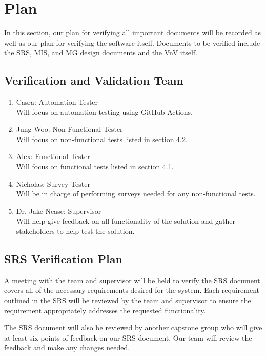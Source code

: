 \documentclass[12pt, titlepage]{article}
\begin{document}
\section{Plan}

In this section, our plan for verifying all important documents will be
recorded as well as our plan for verifying the software itself. Documents to
be verified include the SRS, MIS, and MG design documents and the VnV itself.

\subsection{Verification and Validation Team}

\begin{enumerate}
  \item Casra: Automation Tester\\
  Will focus on automation testing using GitHub Actions.
  \item Jung Woo: Non-Functional Tester\\
  Will focus on non-functional tests listed in section 4.2.
  \item Alex: Functional Tester\\
  Will focus on functional tests listed in section 4.1.
  \item Nicholas: Survey Tester\\
  Will be in charge of performing surveys needed for any non-functional tests.
  \item Dr. Jake Nease: Supervisor\\
  Will help give feedback on all functionality of the solution and gather
  stakeholders to help test the solution.
\end{enumerate}

\subsection{SRS Verification Plan}

A meeting with the team and supervisor will be held to verify the SRS document covers all of
the necessary requirements desired for the system. Each requirement outlined in the SRS will
be reviewed by the team and supervisor to ensure the requirement appropriately addresses the
requested functionality.

The SRS document will also be reviewed by another capstone group who will give
at least six points of feedback on our SRS document. Our team will review the
feedback and make any changes needed.
\end{document}
